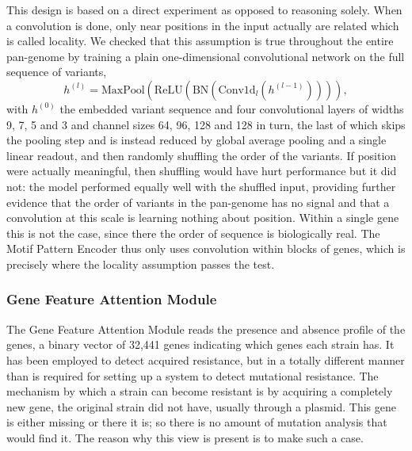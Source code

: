 \documentclass[journal]{IEEEtran}
\begin{document}
This design is based on a direct experiment as opposed to reasoning solely. When a
convolution is done, only near positions in the input actually are related which is
called locality. We checked that this assumption is true throughout the entire
pan-genome by training a plain one-dimensional convolutional network on the full
sequence of variants,
\begin{equation}
h^{(l)} = \mathrm{MaxPool}\!\left(\mathrm{ReLU}\!\left(\mathrm{BN}\!\left(\mathrm{Conv1d}_l\!\left(h^{(l-1)}\right)\right)\right)\right),
\label{eq:naive_cnn}
\end{equation}
with $h^{(0)}$ the embedded variant sequence and four convolutional layers of widths
9, 7, 5 and 3 and channel sizes 64, 96, 128 and 128 in turn, the last of which skips
the pooling step and is instead reduced by global average pooling and a single
linear readout, and then randomly shuffling the order of the variants. If position
were actually meaningful, then shuffling would have hurt performance but it did not:
the model performed equally well with the shuffled input, providing further evidence
that the order of variants in the pan-genome has no signal and that a convolution at
this scale is learning nothing about position. Within a single gene this is not the
case, since there the order of sequence is biologically real. The Motif Pattern
Encoder thus only uses convolution within blocks of genes, which is precisely where
the locality assumption passes the test.

\subsubsection{Gene Feature Attention Module}
\label{subsec:lensB}
The Gene Feature Attention Module reads the presence and absence profile of the
genes, a binary vector of 32{,}441 genes indicating which genes each strain has. It
has been employed to detect acquired resistance, but in a totally different manner
than is required for setting up a system to detect mutational resistance. The
mechanism by which a strain can become resistant is by acquiring a completely new
gene, the original strain did not have, usually through a plasmid. This gene is
either missing or there it is; so there is no amount of mutation analysis that would
find it. The reason why this view is present is to make such a case.
\end{document}
